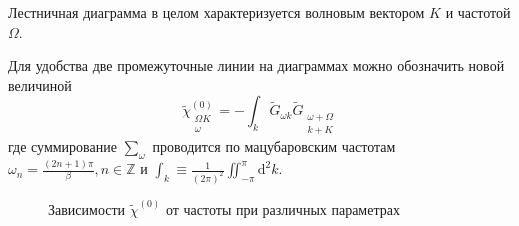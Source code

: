 \documentclass[11pt,a4paper]{report}
\begin{document}
Лестничная диаграмма в целом характеризуется волновым вектором $K$ и частотой $\Omega$.

Для удобства две промежуточные линии на диаграммах можно обозначить новой величиной
\begin{equation}
\tilde{\chi}^{(0)}_{\substack{\Omega K\\\omega}} = -\int_k  \tilde{G}_{\omega k} \tilde{G}_{\substack{\omega+\Omega\\k+K}} 
\end{equation}
где суммирование $\sum_\omega$ проводится по мацубаровским частотам $\omega_n = \frac{(2n+1)\pi}{\beta}, n\in\mathbb{Z}$ и $\int_k \equiv \frac{1}{(2\pi)^2}\iint_{-\pi}^{\pi} \mathrm{d}^2k$.

\begin{figure}[H]
\centering
{}
\caption[]{Зависимости $\tilde{\chi}^{(0)}$ от частоты при различных параметрах}
\end{figure}
\end{document}
